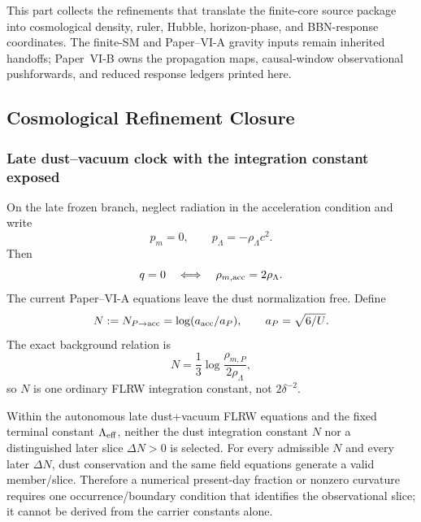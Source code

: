\documentclass[12pt,a4paper]{article}
\begin{document}
\label{p9:part:refinement-horizon-bbn}

This part collects the refinements that translate the finite-core source package into cosmological density, ruler, Hubble, horizon-phase, and BBN-response coordinates.  The finite-SM and Paper--VI-A gravity inputs remain inherited handoffs; Paper~VI-B owns the propagation maps, causal-window observational pushforwards, and reduced response ledgers printed here.

\subsection{Cosmological Refinement Closure}
\label{p9:sec:cosmological-refinement-closure}

\subsubsection{Late dust--vacuum clock with the integration constant exposed}
\label{p9:sec:closed-curvature-clock-density-closure}
On the late frozen branch, neglect radiation in the acceleration condition and
write
\[
p_m=0,\qquad p_\Lambda=-\rho_\Lambda c^2.
\]
Then
\begin{equation}
\label{p9:eq:qzero-density-ratio}
q=0\quad\Longleftrightarrow\quad \rho_{m,\rm acc}=2\rho_\Lambda.
\end{equation}
The current Paper--VI-A equations leave the dust normalization free.  Define
\[
N:=N_{P\to\rm acc}=\log(a_{\rm acc}/a_P),
\qquad a_P=\sqrt{6/U}.
\]
The exact background relation is
\begin{equation}
\label{p9:eq:free-depth-rhoP}
N=\frac13\log\frac{\rho_{m,P}}{2\rho_\Lambda},
\end{equation}
so \(N\) is one ordinary FLRW integration constant, not \(2\delta^{-2}\).

\begin{proposition}
\label{p9:prop:present-slice-no-go}
Within the autonomous late dust+vacuum FLRW equations and the fixed terminal
constant \(\Lambda_{\rm eff}\), neither the dust integration constant \(N\) nor
a distinguished later slice \(\Delta N>0\) is selected.  For every admissible
\(N\) and every later \(\Delta N\), dust conservation and the same field
equations generate a valid member/slice.  Therefore a numerical present-day
fraction or nonzero curvature requires one occurrence/boundary condition that
identifies the observational slice; it cannot be derived from the carrier
constants alone.
\end{proposition}
\end{document}
